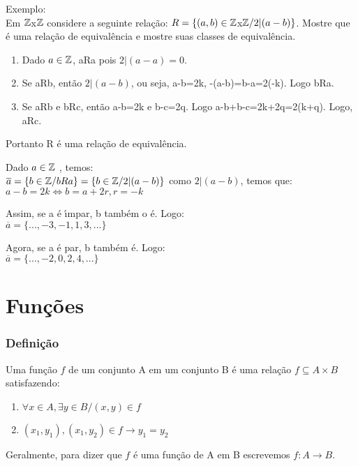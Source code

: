 Exemplo:\\
Em $\mathbb{Z}$x$\mathbb{Z}$ considere a seguinte rela{\c c}{\~a}o: $R=\{(a,b)\in \mathbb{Z}$x$\mathbb{Z}/2|(a-b)\}$. Mostre que {\'e} uma rela{\c c}{\~a}o de equival{\^e}ncia e mostre suas classes de equival{\^e}ncia.
\begin{enumerate}[label={\alph*})]
\item Dado $a\in \mathbb{Z}$, aRa pois $2|(a-a)=0$.
\item Se aRb, ent{\~a}o $2|(a-b)$, ou seja, a-b=2k, -(a-b)=b-a=2(-k). Logo bRa.
\item Se aRb e bRc, ent{\~a}o a-b=2k e b-c=2q. Logo a-b+b-c=2k+2q=2(k+q). Logo, aRc.
\end{enumerate}

Portanto R {\'e} uma rela{\c c}{\~a}o de equival{\^e}ncia.

Dado $a\in\mathbb{Z}$ , temos:\\
$\overline{a}=\{b\in\mathbb{Z}/bRa\}=\{b\in\mathbb{Z}/2|(a-b)\}$ como $2|(a-b)$, temos que:\\
$a-b=2k\Leftrightarrow b=a+2r, r=-k$

Assim, se a {\'e} {\'\i}mpar, b tamb{\'e}m o {\'e}. Logo:\\
$\overline{a}=\{...,-3,-1,1,3,...\}$

Agora, se a {\'e} par, b tamb{\'e}m {\'e}. Logo:\\
$\overline{a}=\{...,-2,0,2,4,...\}$

\section{Fun{\c c}{\~o}es}

\subsubsection{Defini{\c c}{\~a}o}
\begin{definicao}[Fun{\c c}{\~a}o] Uma fun{\c c}{\~a}o $f$ de um conjunto A em um conjunto B {\'e} uma rela{\c c}{\~a}o $f\subseteq A\times B$ satisfazendo:
\begin{enumerate}
\item $\forall x\in A,\exists y\in B/(x,y)\in f$
\item $(x_{1},y_{1}),(x_{1},y_{2})\in f \rightarrow y_{1}=y_{2}$
\end{enumerate}
\end{definicao}

Geralmente, para dizer que $f$ {\'e} uma fun{\c c}{\~a}o de A em B escrevemos $f:A\rightarrow B$.

